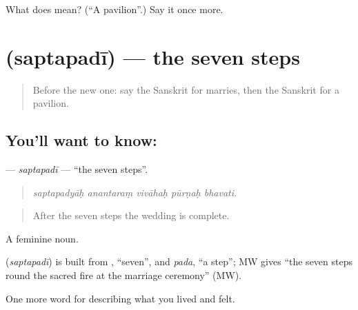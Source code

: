 \begin{tcolorbox}[breakable,colback=teal!4,colframe=teal!35!black,title={Before you move on}]
What does  mean? (\textquotedblleft{}A pavilion\textquotedblright{}.) Say it once more.
\end{tcolorbox}
\section[\texorpdfstring{\sk{सप्तपदी} (saptapadī)}{सप्तपदी (saptapadī)}]{ (saptapadī) — the seven steps}

\label{lesson:SA-C496-saptapadi}



\begin{quote}
Before the new one: say the Sanskrit for marries, then the Sanskrit for a pavilion.
\end{quote}

\subsection*{You'll want to know: }
\textbf{} — \emph{saptapadī} — \textquotedblleft{}the seven steps\textquotedblright{}.

\begin{quote}
    
\end{quote}

\begin{quote}
\emph{saptapadyāḥ anantaraṃ vivāhaḥ pūrṇaḥ bhavati.}
\end{quote}

\begin{quote}
After the seven steps the wedding is complete.
\end{quote}

A feminine noun.

\begin{cousinweb}
\textbf{} (\emph{saptapadī}) is built from \textbf{}, \textquotedblleft{}seven\textquotedblright{}, and \emph{pada}, \textquotedblleft{}a step\textquotedblright{}; MW gives \textquotedblleft{}the seven steps round the sacred fire at the marriage ceremony\textquotedblright{} (MW).
\end{cousinweb}

\begin{grammarlens}[title={What you've built}]
One more word for describing what you lived and felt.
\end{grammarlens}

